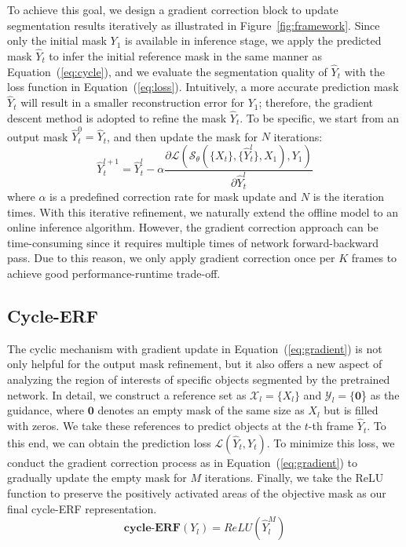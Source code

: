 \documentclass{article}
\begin{document}
To achieve this goal, we design a gradient correction block to update segmentation results iteratively as illustrated in Figure~\ref{fig:framework}. Since only the initial mask $Y_1$ is available in inference stage, we apply the predicted mask $\widehat{Y}_t$ to infer the initial reference mask in the same manner as Equation~(\ref{eq:cycle}), and we evaluate the segmentation quality of $\widehat{Y}_t$ with the loss function in Equation~(\ref{eq:loss}). Intuitively, a more accurate prediction mask $\widehat{Y}_t$ will result in a smaller reconstruction error for $Y_1$; therefore, the gradient descent method is adopted to refine the mask $\widehat{Y}_t$. To be specific, we start from an output mask $\widehat{Y}^0_t=\widehat{Y}_t$, and then update the mask for $N$ iterations:
\begin{equation}\label{eq:gradient}
    \widehat{Y}_{t}^{l+1} = \widehat{Y}^{l}_{t} - \alpha \frac{\partial\mathcal{L}\left(\mathcal{S}_{\theta}\left(\{X_t\}, \{\widehat{Y}^{l}_{t}\}, X_1\right), Y_1\right)}{\partial\widehat{Y}^{l}_{t}}
\end{equation}
where $\alpha$ is a predefined correction rate for mask update and $N$ is the iteration times. With this iterative refinement, we naturally extend the offline model to an online inference algorithm. However, the gradient correction approach can be time-consuming since it requires multiple times of network forward-backward pass. Due to this reason, we only apply gradient correction once per $K$ frames to achieve good performance-runtime trade-off.

\subsection{Cycle-ERF}
The cyclic mechanism with gradient update in Equation~(\ref{eq:gradient}) is not only helpful for the output mask refinement, but it also offers a new aspect of analyzing the region of interests of specific objects segmented by the pretrained network. In detail, we construct a reference set as $\mathcal{X}_l=\{X_l\}$ and $\mathcal{Y}_l=\{\mathbf{0}$\} as the guidance, where $\mathbf{0}$ denotes an empty mask of the same size as $X_l$ but is filled with zeros. We take these references to predict objects at the $t$-th frame $\widehat{Y}_t$. To this end, we can obtain the prediction loss $\mathcal{L}(\widehat{Y}_t, Y_t)$. To minimize this loss, we conduct the gradient correction process as in Equation~(\ref{eq:gradient}) to gradually update the empty mask for $M$ iterations. Finally, we take the ReLU function to preserve the positively activated areas of the objective mask as our final cycle-ERF representation.
\begin{equation}\label{eq:erf}
    \textbf{cycle-ERF}(Y_l) = ReLU\left(\widehat{Y}^{M}_{l}\right)
\end{equation}
\end{document}
